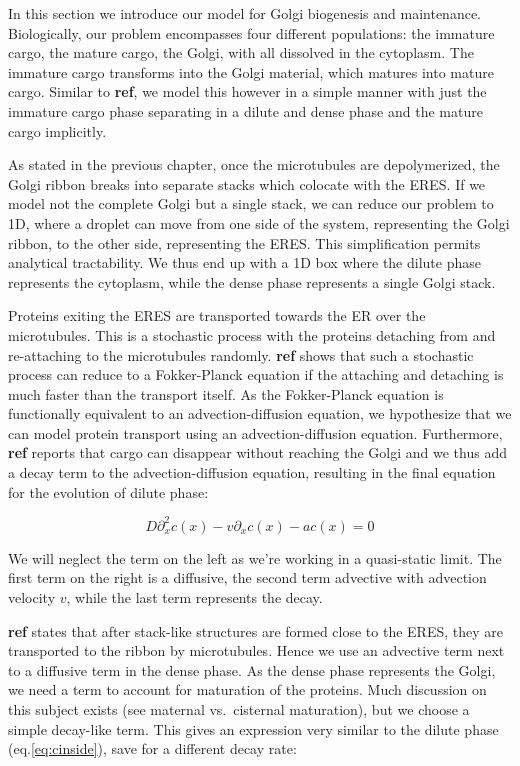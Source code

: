\documentclass[12pt,a4paper,]{Dissertate}
\begin{document}
In this section we introduce our model for Golgi biogenesis and
maintenance. Biologically, our problem encompasses four different
populations: the immature cargo, the mature cargo, the Golgi, with all
dissolved in the cytoplasm. The immature cargo transforms into the Golgi
material, which matures into mature cargo. Similar to \textbf{ref}, we
model this however in a simple manner with just the immature cargo phase
separating in a dilute and dense phase and the mature cargo implicitly.

As stated in the previous chapter, once the microtubules are
depolymerized, the Golgi ribbon breaks into separate stacks which
colocate with the ERES. If we model not the complete Golgi but a single
stack, we can reduce our problem to 1D, where a droplet can move from
one side of the system, representing the Golgi ribbon, to the other
side, representing the ERES. This simplification permits analytical
tractability. We thus end up with a 1D box where the dilute phase
represents the cytoplasm, while the dense phase represents a single
Golgi stack.

Proteins exiting the ERES are transported towards the ER over the
microtubules. This is a stochastic process with the proteins detaching
from and re-attaching to the microtubules randomly. \textbf{ref} shows
that such a stochastic process can reduce to a Fokker-Planck equation if
the attaching and detaching is much faster than the transport itself. As
the Fokker-Planck equation is functionally equivalent to an
advection-diffusion equation, we hypothesize that we can model protein
transport using an advection-diffusion equation. Furthermore,
\textbf{ref} reports that cargo can disappear without reaching the Golgi
and we thus add a decay term to the advection-diffusion equation,
resulting in the final equation for the evolution of dilute phase:

\begin{equation}
D\partial_x^2 c(x) - v\partial_xc(x)-ac(x)=0
\label{eq:cinside}\end{equation}

We will neglect the term on the left as we're working in a quasi-static
limit. The first term on the right is a diffusive, the second term
advective with advection velocity \(v\), while the last term represents
the decay.

\textbf{ref} states that after stack-like structures are formed close to
the ERES, they are transported to the ribbon by microtubules. Hence we
use an advective term next to a diffusive term in the dense phase. As
the dense phase represents the Golgi, we need a term to account for
maturation of the proteins. Much discussion on this subject exists (see
maternal vs.~cisternal maturation), but we choose a simple decay-like
term. This gives an expression very similar to the dilute phase
(eq.\ref{eq:cinside}), save for a different decay rate:
\end{document}
